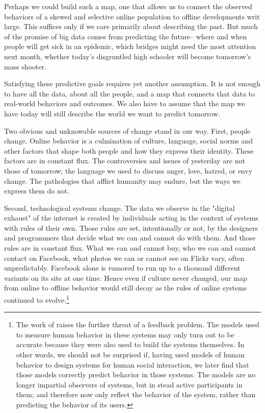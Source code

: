 \documentclass[12pt]{article}
\begin{document}
Perhaps we could build such a map, one that allows us to connect the
observed behaviors of a skewed and selective online population to
offline developments writ large. This suffices only if we care
primarily about describing the past. But much of the promise of big
data comes from predicting the future-- where and when people will get
sick in an epidemic, which bridges might need the most attention next
month, whether today's disgruntled high schooler will become
tomorrow's mass shooter.

Satisfying these predictive goals requires yet another assumption. It
is not enough to have all the data, about all the people, and a map
that connects that data to real-world behaviors and outcomes. We also
have to assume that the map we have today will still describe the
world we want to predict tomorrow. 

Two obvious and unknowable sources of change stand in our way. First,
people change. Online behavior is a culmination of culture, language,
social norms and other factors that shape both people and how they
express their identity. These factors are in constant flux. The
controversies and issues of yesterday are not those of tomorrow; the
language we used to discuss anger, love, hatred, or envy change.
The pathologies that afflict humanity may endure, but the ways we
express them do not. 

Second, technological systems change. The data we observe in the
"digital exhaust" of the internet is created by individuals acting in
the context of systems with rules of their own. Those rules are set,
intentionally or not, by the designers and programmers that decide
what we can and cannot do with them. And those rules are in constant
flux. What we can and cannot buy, who we can and cannot contact on
Facebook, what photos we can or cannot see on Flickr vary, often
unpredictably. Facebook alone is rumored to run up to a thousand
different variants on its site at one time. Hence even if culture
never changed, our map from online to offline behavior would still
decay as the rules of online systems continued to evolve.\footnote{The
work of \cite{mackenzie2006engine} raises the further threat of a
feedback problem. The models used to measure human behavior in these
systems may only turn out to be accurate because they were also used
to build the systems themselves. In other words, we should not be
surprised if, having used models of
human behavior to design systems for human social interaction, we
later find that those models correctly predict behavior in those
systems. The models are no longer impartial observers of systems, but
in stead active participants in them; and therefore now only reflect
the behavior of the system, rather than predicting the behavior of its
users.}
\end{document}
